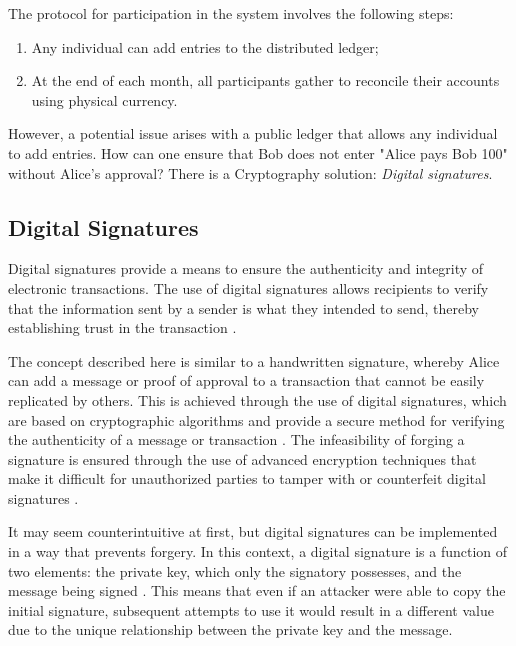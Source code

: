 The protocol for participation in the system involves the following steps:

\begin{enumerate}
    \item Any individual can add entries to the distributed ledger;
    \item At the end of each month, all participants gather to reconcile their accounts using physical currency.
\end{enumerate}

However, a potential issue arises with a public ledger that allows any individual to add entries. How can one ensure that Bob does not enter "Alice pays Bob 100" without Alice's approval? There is a Cryptography solution: \emph{Digital signatures}.

\subsection{Digital Signatures}
Digital signatures provide a means to ensure the authenticity and integrity of electronic transactions. The use of digital signatures allows recipients to verify that the information sent by a sender is what they intended to send, thereby establishing trust in the transaction \cite{stinson2018cryptography}.

The concept described here is similar to a handwritten signature, whereby Alice can add a message or proof of approval to a transaction that cannot be easily replicated by others. This is achieved through the use of digital signatures, which are based on cryptographic algorithms and provide a secure method for verifying the authenticity of a message or transaction \cite{elgamal1985public}. The infeasibility of forging a signature is ensured through the use of advanced encryption techniques that make it difficult for unauthorized parties to tamper with or counterfeit digital signatures \cite{elgamal1985public}.

%

It may seem counterintuitive at first, but digital signatures can be implemented in a way that prevents forgery. In this context, a digital signature is a function of two elements: the private key, which only the signatory possesses, and the message being signed \cite{diffie2022new}. This means that even if an attacker were able to copy the initial signature, subsequent attempts to use it would result in a different value due to the unique relationship between the private key and the message.

